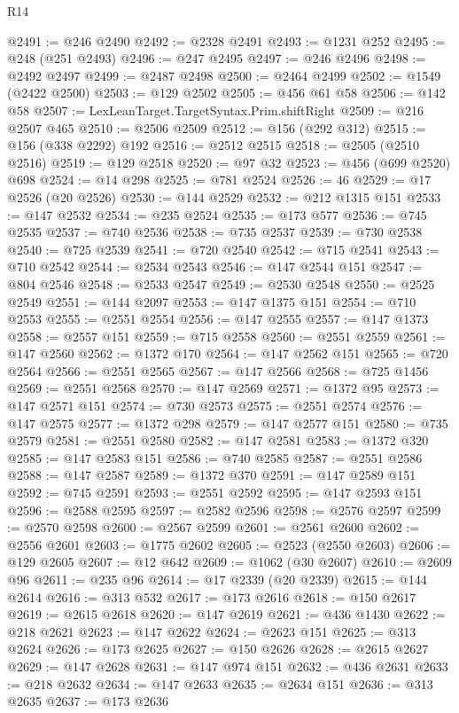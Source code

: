 \begin{lexlean}{R14}
\begin{coremodule}
@2491 := @246 @2490
@2492 := @2328 @2491
@2493 := @1231 @252
@2495 := @248 (@251 @2493)
@2496 := @247 @2495
@2497 := @246 @2496
@2498 := @2492 @2497
@2499 := @2487 @2498
@2500 := @2464 @2499
@2502 := @1549 (@2422 @2500)
@2503 := @129 @2502
@2505 := @456 @61 @58
@2506 := @142 @58
@2507 := LexLeanTarget.TargetSyntax.Prim.shiftRight
@2509 := @216 @2507 @465
@2510 := @2506 @2509
@2512 := @156 (@292 @312)
@2515 := @156 (@338 @2292) @192
@2516 := @2512 @2515
@2518 := @2505 (@2510 @2516)
@2519 := @129 @2518
@2520 := @97 @32
@2523 := @456 (@699 @2520) @698
@2524 := @14 @298
@2525 := @781 @2524
@2526 := 46
@2529 := @17 @2526 (@20 @2526)
@2530 := @144 @2529
@2532 := @212 @1315 @151
@2533 := @147 @2532
@2534 := @235 @2524
@2535 := @173 @577
@2536 := @745 @2535
@2537 := @740 @2536
@2538 := @735 @2537
@2539 := @730 @2538
@2540 := @725 @2539
@2541 := @720 @2540
@2542 := @715 @2541
@2543 := @710 @2542
@2544 := @2534 @2543
@2546 := @147 @2544 @151
@2547 := @804 @2546
@2548 := @2533 @2547
@2549 := @2530 @2548
@2550 := @2525 @2549
@2551 := @144 @2097
@2553 := @147 @1375 @151
@2554 := @710 @2553
@2555 := @2551 @2554
@2556 := @147 @2555
@2557 := @147 @1373
@2558 := @2557 @151
@2559 := @715 @2558
@2560 := @2551 @2559
@2561 := @147 @2560
@2562 := @1372 @170
@2564 := @147 @2562 @151
@2565 := @720 @2564
@2566 := @2551 @2565
@2567 := @147 @2566
@2568 := @725 @1456
@2569 := @2551 @2568
@2570 := @147 @2569
@2571 := @1372 @95
@2573 := @147 @2571 @151
@2574 := @730 @2573
@2575 := @2551 @2574
@2576 := @147 @2575
@2577 := @1372 @298
@2579 := @147 @2577 @151
@2580 := @735 @2579
@2581 := @2551 @2580
@2582 := @147 @2581
@2583 := @1372 @320
@2585 := @147 @2583 @151
@2586 := @740 @2585
@2587 := @2551 @2586
@2588 := @147 @2587
@2589 := @1372 @370
@2591 := @147 @2589 @151
@2592 := @745 @2591
@2593 := @2551 @2592
@2595 := @147 @2593 @151
@2596 := @2588 @2595
@2597 := @2582 @2596
@2598 := @2576 @2597
@2599 := @2570 @2598
@2600 := @2567 @2599
@2601 := @2561 @2600
@2602 := @2556 @2601
@2603 := @1775 @2602
@2605 := @2523 (@2550 @2603)
@2606 := @129 @2605
@2607 := @12 @642
@2609 := @1062 (@30 @2607)
@2610 := @2609 @96
@2611 := @235 @96
@2614 := @17 @2339 (@20 @2339)
@2615 := @144 @2614
@2616 := @313 @532
@2617 := @173 @2616
@2618 := @150 @2617
@2619 := @2615 @2618
@2620 := @147 @2619
@2621 := @436 @1430
@2622 := @218 @2621
@2623 := @147 @2622
@2624 := @2623 @151
@2625 := @313 @2624
@2626 := @173 @2625
@2627 := @150 @2626
@2628 := @2615 @2627
@2629 := @147 @2628
@2631 := @147 @974 @151
@2632 := @436 @2631
@2633 := @218 @2632
@2634 := @147 @2633
@2635 := @2634 @151
@2636 := @313 @2635
@2637 := @173 @2636

\end{coremodule}
\end{lexlean}
